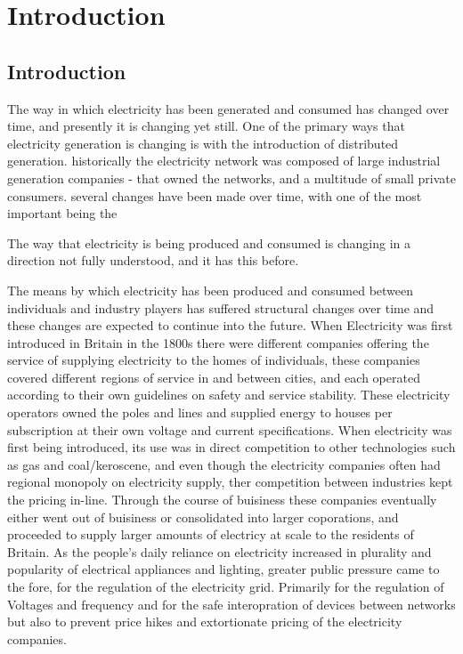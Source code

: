 \chapter{Introduction}
\label{cha:intro}



\section{Introduction}


The way in which electricity has been generated and consumed has changed over time, and presently it is changing yet still.
One of the primary ways that electricity generation is changing is with the introduction of distributed generation.
historically the electricity network was composed of large industrial generation companies - that owned the networks, and a multitude of small private consumers.
several changes have been made over time, with one of the most important being the 




The way that electricity is being produced and consumed is changing in a direction not fully understood, and it has this before.

The means by which electricity has been produced and consumed between individuals and industry players has suffered structural changes over time and these changes are expected to continue into the future.
When Electricity was first introduced in Britain in the 1800s there were different companies offering the service of supplying electricity to the homes of individuals, these companies covered different regions of service in and between cities, and each operated according to their own guidelines on safety and service stability.
These electricity operators owned the poles and lines and supplied energy to houses per subscription at their own voltage and current specifications.
When electricity was first being introduced, its use was in direct competition to other technologies such as gas and coal/keroscene, and even though the electricity companies often had regional monopoly on electricity supply, ther competition between industries kept the pricing in-line.
Through the course of buisiness these companies eventually either went out of buisiness or consolidated into larger coporations, and proceeded to supply larger amounts of electricy at scale to the residents of Britain.
As the people's daily reliance on electricity increased in plurality and popularity of electrical appliances and lighting, greater public pressure came to the fore, for the regulation of the electricity grid.
Primarily for the regulation of Voltages and frequency and for the safe interopration of devices between networks but also to prevent price hikes and extortionate pricing of the electricity companies.



